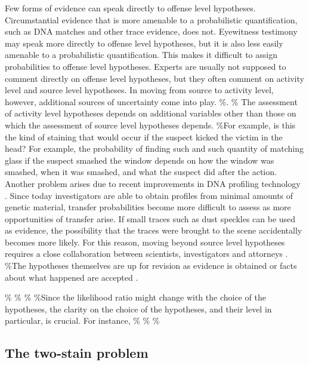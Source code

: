 \documentclass[10pt,dvipsnames,enabledeprecatedfontcommands]{scrartcl}
\begin{document}
Few forms of evidence can speak directly to offense level hypotheses.
Circumstantial evidence that is more amenable to a probabilistic
quantification, such as DNA matches and other trace evidence, does not.
Eyewitness testimony may speak more directly to offense level
hypotheses, but it is also less easily amenable to a probabilistic
quantification. This makes it difficult to assign probabilities to
offense level hypotheses. Experts are usually not supposed to comment
directly on offense level hypotheses, but they often comment on activity
level and source level hypotheses. In moving from source to activity
level, however, additional sources of uncertainty come into play.
\%\citep{Cook1998hierarchy}. \% The assessment of activity level
hypotheses depends on additional variables other than those on which the
assessment of source level hypotheses depends. \%For example, is this
the kind of staining that would occur if the suspect kicked the victim
in the head? For example, the probability of finding such and such
quantity of matching glass if the suspect smashed the window depends on
how the window was smashed, when it was smashed, and what the suspect
did after the action. Another problem arises due to recent improvements
in DNA profiling technology \citep{Cook1998hierarchy}. Since today
investigators are able to obtain profiles from minimal amounts of
genetic material, transfer probabilities become more difficult to assess
as more opportunities of transfer arise. If small traces such as dust
speckles can be used as evidence, the possibility that the traces were
brought to the scene accidentally becomes more likely. For this reason,
moving beyond source level hypotheses requires a close collaboration
between scientists, investigators and attorneys
\citep[see][for a discussion]{Cook1998hierarchy}. \%The hypotheses
themselves are up for revision as evidence is obtained or facts about
what happened are accepted \citep{evett2000MoreHierarchyPropositions}.

\% \% \% \%Since the likelihood ratio might change with the choice of
the hypotheses, the clarity on the choice of the hypotheses, and their
level in particular, is crucial. For instance, \% \% \%

\subsection{The two-stain problem}\label{the-two-stain-problem}

\end{document}
